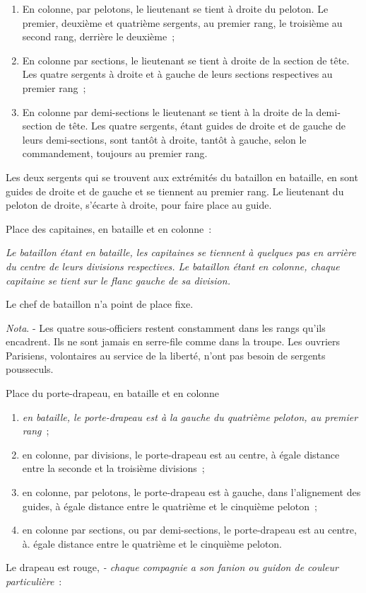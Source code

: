 \documentclass[french,twoside]{book} %
\begin{document}
\begin{enumerate}[itemsep=0pt,]
\item En colonne, par pelotons, le lieutenant se tient à droite du peloton. Le premier, deuxième et quatrième sergents, au premier rang, le troisième au second rang, derrière le deuxième ;
\item En colonne par sections, le lieutenant se tient à droite de la section de tête. Les quatre sergents à droite et à gauche de leurs sections respectives au premier rang ;
\item En colonne par demi-sections le lieutenant se tient à la droite de la demi-section de tête. Les quatre sergents, étant guides de droite et de gauche de leurs demi-sections, sont tantôt à droite, tantôt à gauche, selon le commandement, toujours au premier rang.

\end{enumerate}\noindent Les deux sergents qui se trouvent aux extrémités du bataillon en bataille, en sont guides de droite et de gauche et se tiennent au premier rang. Le lieutenant du peloton de droite, s’écarte à droite, pour faire place au guide.\par
Place des capitaines, en bataille et en colonne :\par
{\itshape Le bataillon étant en bataille, les capitaines se tiennent à quelques pas en arrière du centre de leurs divisions respectives. Le bataillon étant en colonne, chaque capitaine se tient sur le flanc gauche de sa division.}\par
Le chef de bataillon n’a point de place fixe.\par
\emph{Nota}. - Les quatre sous-officiers restent constamment dans les rangs qu’ils encadrent. Ils ne sont jamais en serre-file comme dans la troupe. Les ouvriers Parisiens, volontaires au service de la liberté, n’ont pas besoin de sergents pousseculs.\par
Place du porte-drapeau, en bataille et en colonne\par

\begin{enumerate}[itemsep=0pt,]
\item \emph{en bataille, le porte-drapeau est à la gauche du quatrième peloton, au premier rang} ;
\item en colonne, par divisions, le porte-drapeau est au centre, à égale distance entre la seconde et la troisième divisions ;
\item en colonne, par pelotons, le porte-drapeau est à gauche, dans l’alignement des guides, à égale distance entre le quatrième et le cinquième peloton ;
\item en colonne par sections, ou par demi-sections, le porte-drapeau est au centre, à. égale distance entre le quatrième et le cinquième peloton.

\end{enumerate}\noindent Le drapeau est rouge, \emph{- chaque compagnie a son fanion ou guidon de couleur particulière} :\par
\end{document}
